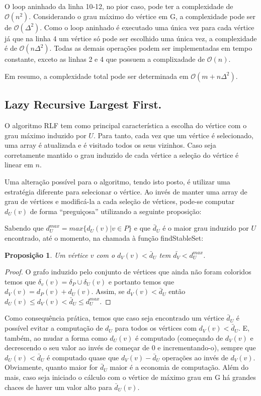 \documentclass[a4paper,12pt]{article}
\newtheorem{lazy}{Proposição}
\begin{document}
O loop aninhado da linha 10-12, no pior caso, pode ter a complexidade de $\mathcal{O}(n^2)$. Considerando o grau máximo do vértice em G, a complexidade pode ser de $\mathcal{O}(\Delta^2)$. Como o loop aninhado é executado uma única vez para cada vértice já que na linha 4 um vértice só pode ser escolhido uma única vez, a complexidade é de $\mathcal{O}(n\Delta^2)$. Todas as demais operações podem ser implementadas em tempo constante, exceto as linhas 2 e 4 que possuem a complixadade de $\mathcal{O}(n)$.

Em resumo, a complexidade total pode ser determinada em $\mathcal{O}(m + n\Delta^2)$.

\subsection{Lazy Recursive Largest First.}

O algoritmo RLF tem como principal característica a escolha do vértice com o grau máximo induzido por $U$. Para tanto, cada vez que um vértice é selecionado, uma array é atualizada e é visitado todos os seus vizinhos. Caso seja corretamente mantido o grau induzido de cada vértice a seleção do vértice é linear em $n$.

Uma alteração possível para o algoritmo, tendo isto posto, é utilizar uma estratégia diferente para selecionar o vértice. Ao invés de manter uma array de grau de vértices e modificá-la a cada seleção de vértices, pode-se computar $d_U(v)$ de forma ``preguiçosa'' utilizando a seguinte proposição:

Sabendo que $d_U^{max} = max\{d_U(v) | v \in P\}$ e que $\bar{d}_U$ é o maior grau induzido por $U$ encontrado, até o momento, na chamada à função findStableSet:
\begin{lazy}
  Um vértice $v$ com o $d_V(v) < \bar{d}_U$ tem $\bar{d_V} < d_U^{max}$.
\end{lazy}

\begin{proof}
  O grafo induzido pelo conjunto de vértices que ainda não foram coloridos temos que $\delta_v(v) = \delta_P \cup \delta_U(v)$ e portanto temos que $d_V(v) = d_P(v) + d_U(v)$. Assim, se $d_V(v) < \bar{d}_U$ então $d_U(v) \leq d_V(v) < \bar{d}_U \leq d_U^{max}$.
\end{proof}

Como consequência prática, temos que caso seja encontrado um vértice $\bar{d}_U$ é possível evitar a computação de  $d_U$ para todos os vértices com $d_V(v) < \bar{d}_U$. E, também, ao mudar a forma como $d_U(v)$ é computado (começando de $d_V(v)$ e decrescendo o seu valor ao invés de começar de 0 e incrementando-o), sempre que $d_U(v) < \bar{d}_U$ é computado quase que $d_V(v) - \bar{d}_U$ operações ao invés de $d_V(v)$.
Obviamente, quanto maior for $\bar{d}_U$ maior é a economia de computação. Além do mais, caso seja iniciado o cálculo com o vértice de máximo grau em G há grandes chaces de haver um valor alto para $\bar{d}_U(v)$.
\end{document}
